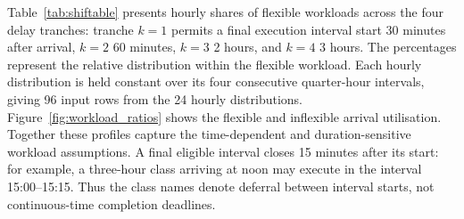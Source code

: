 \documentclass[lettersize,journal]{IEEEtran}
\begin{document}
\begin{table}[!t]
\centering
\caption{Hourly Tranche Shares in the Adopted Inputs (\%)}
\label{tab:shiftable}
\setlength{\tabcolsep}{4pt}
\begin{small}
\end{small}
\end{table}

Table~\ref{tab:shiftable} presents hourly shares of flexible workloads across the four delay tranches: tranche $k=1$ permits a final execution interval start 30 minutes after arrival, $k=2$ 60 minutes, $k=3$ 2 hours, and $k=4$ 3 hours. The percentages represent the relative distribution within the flexible workload. Each hourly distribution is held constant over its four consecutive quarter-hour intervals, giving 96 input rows from the 24 hourly distributions. Figure~\ref{fig:workload_ratios} shows the flexible and inflexible arrival utilisation. Together these profiles capture the time-dependent and duration-sensitive workload assumptions. A final eligible interval closes 15 minutes after its start: for example, a three-hour class arriving at noon may execute in the interval 15:00--15:15. Thus the class names denote deferral between interval starts, not continuous-time completion deadlines.
\end{document}
